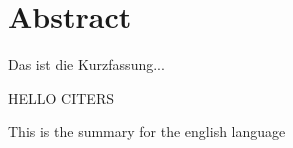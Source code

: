 \chapter*{Abstract}


Das ist die Kurzfassung... \cite{8101926}

HELLO CITERS\cite{website1}



This is the summary for the english language